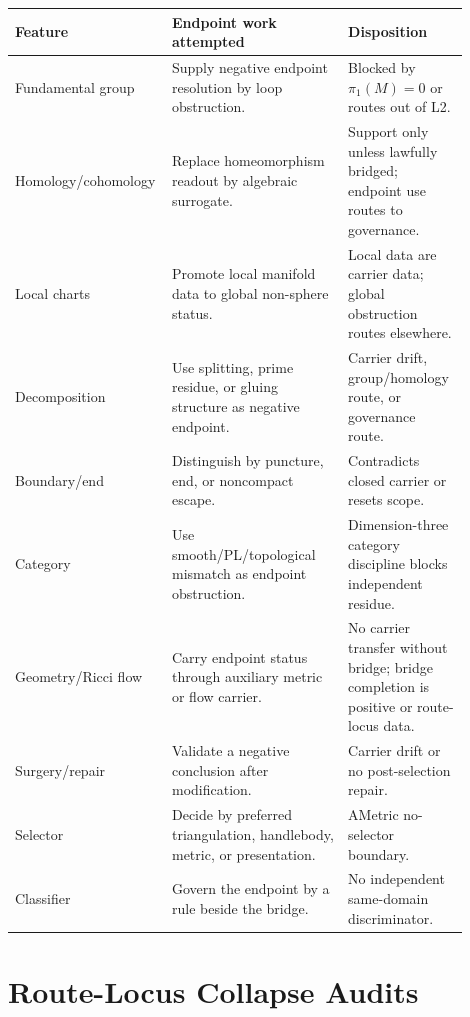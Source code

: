 \documentclass[11pt]{article}
\begin{document}
\begin{longtable}{L{0.26\linewidth}L{0.38\linewidth}L{0.26\linewidth}}
\toprule
\textbf{Feature} & \textbf{Endpoint work attempted} & \textbf{Disposition}\\
\midrule
Fundamental group & Supply negative endpoint resolution by loop obstruction. & Blocked by \(\pi_1(M)=0\) or routes out of L2.\\
Homology/cohomology & Replace homeomorphism readout by algebraic surrogate. & Support only unless lawfully bridged; endpoint use routes to governance.\\
Local charts & Promote local manifold data to global non-sphere status. & Local data are carrier data; global obstruction routes elsewhere.\\
Decomposition & Use splitting, prime residue, or gluing structure as negative endpoint. & Carrier drift, group/homology route, or governance route.\\
Boundary/end & Distinguish by puncture, end, or noncompact escape. & Contradicts closed carrier or resets scope.\\
Category & Use smooth/PL/topological mismatch as endpoint obstruction. & Dimension-three category discipline blocks independent residue.\\
Geometry/Ricci flow & Carry endpoint status through auxiliary metric or flow carrier. & No carrier transfer without bridge; bridge completion is positive or route-locus data.\\
Surgery/repair & Validate a negative conclusion after modification. & Carrier drift or no post-selection repair.\\
Selector & Decide by preferred triangulation, handlebody, metric, or presentation. & AMetric no-selector boundary.\\
Classifier & Govern the endpoint by a rule beside the bridge. & No independent same-domain discriminator.\\
\bottomrule
\end{longtable}

\section{Route-Locus Collapse Audits}\label{sec:locus-collapses}
\end{document}
